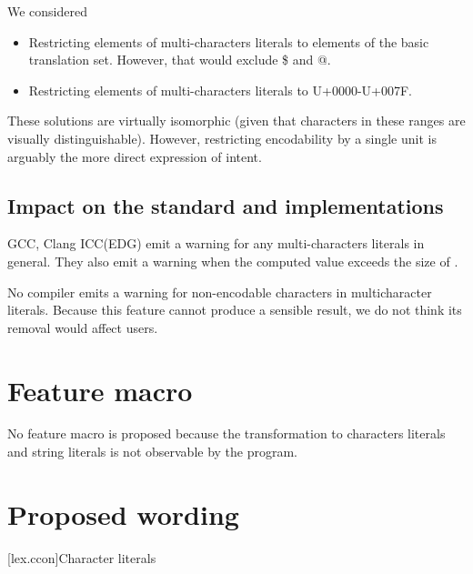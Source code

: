 \documentclass{wg21}
\begin{document}
    We considered
    \begin{itemize}
        \item Restricting elements of multi-characters literals to elements of the basic translation set. However, that would exclude \$ and @.
        \item Restricting elements of multi-characters literals to U+0000-U+007F.
    \end{itemize}

    These solutions are virtually isomorphic (given that characters in these ranges are visually distinguishable). However, restricting encodability by a single unit is arguably the more direct expression of intent.


    \subsection{Impact on the standard and implementations}

    GCC, Clang ICC(EDG) emit a warning for any multi-characters literals in general. They also emit a warning when the computed value exceeds the size of .

    No compiler emits a warning for non-encodable characters in multicharacter literals.
    Because this feature cannot produce a sensible result, we do not think its removal would affect users.

    \section{Feature macro}

    No feature macro is proposed because the transformation to characters literals and string literals is not observable by the program.


    \section{Proposed wording}



    [lex.ccon]{Character literals}
\end{document}
